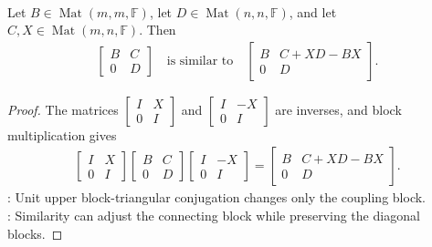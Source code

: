 \begin{proposition} \label{prop:upper-block-triangular-similarity-shift} \\
Let $B\in\operatorname{Mat}(m,m,\mathbb{F})$, let $D\in\operatorname{Mat}(n,n,\mathbb{F})$, and let $C,X\in\operatorname{Mat}(m,n,\mathbb{F})$. Then
\begin{align}
\begin{bmatrix}
B & C\\
0 & D
\end{bmatrix}
\quad\text{is similar to}\quad
\begin{bmatrix}
B & C+XD-BX\\
0 & D
\end{bmatrix}.
\nonumber
\end{align}
\begin{proof}
The matrices $\begin{bmatrix} I & X\\ 0 & I \end{bmatrix}$ and $\begin{bmatrix} I & -X\\ 0 & I \end{bmatrix}$ are inverses, and block multiplication gives
\begin{align}
\begin{bmatrix}
I & X\\
0 & I
\end{bmatrix}
\begin{bmatrix}
B & C\\
0 & D
\end{bmatrix}
\begin{bmatrix}
I & -X\\
0 & I
\end{bmatrix}
=
\begin{bmatrix}
B & C+XD-BX\\
0 & D
\end{bmatrix}.
\nonumber
\end{align}
: Unit upper block-triangular conjugation changes only the coupling block.\\
: Similarity can adjust the connecting block while preserving the diagonal blocks.
\end{proof}
\end{proposition}
